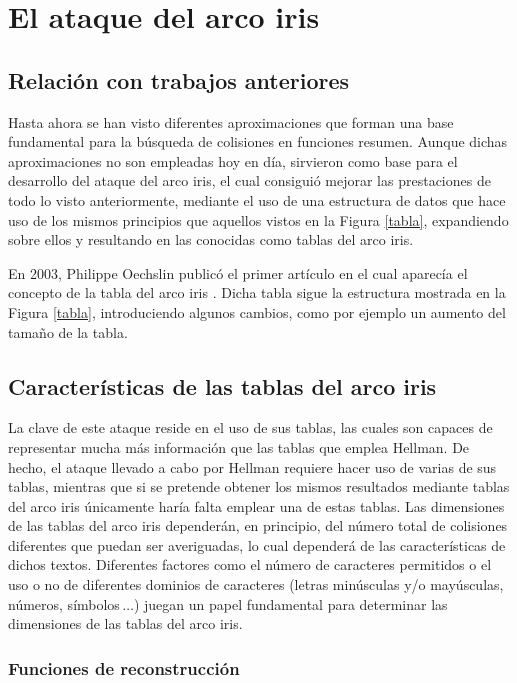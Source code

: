 \documentclass[12pt,spanish,listoffigures,listoftables,listofalgorithms]{tfgetsinf}
\begin{document}
\chapter{El ataque del arco iris} \label{ataque}

\section{Relación con trabajos anteriores}

Hasta ahora se han visto diferentes aproximaciones que forman una base fundamental para la búsqueda de colisiones en funciones resumen. Aunque dichas aproximaciones no son empleadas hoy en día, sirvieron como base para el desarrollo del ataque del arco iris, el cual consiguió mejorar las prestaciones de todo lo visto anteriormente, mediante el uso de una estructura de datos que hace uso de los mismos principios que aquellos vistos en la Figura \ref{tabla}, expandiendo sobre ellos y resultando en las conocidas como tablas del arco iris.

En 2003, Philippe Oechslin publicó el primer artículo en el cual aparecía el concepto de la tabla del arco iris \cite{rainbow}. Dicha tabla sigue la estructura mostrada en la Figura \ref{tabla}, introduciendo algunos cambios, como por ejemplo un aumento del tamaño de la tabla.

\section{Características de las tablas del arco iris}

La clave de este ataque reside en el uso de sus tablas, las cuales son capaces de representar mucha más información que las tablas que emplea Hellman. De hecho, el ataque llevado a cabo por Hellman requiere hacer uso de varias de sus tablas, mientras que si se pretende obtener los mismos resultados mediante tablas del arco iris únicamente haría falta emplear una de estas tablas. Las dimensiones de las tablas del arco iris dependerán, en principio, del número total de colisiones diferentes que puedan ser averiguadas, lo cual dependerá de las características de dichos textos. Diferentes factores como el número de caracteres permitidos o el uso o no de diferentes dominios de caracteres (letras minúsculas y/o mayúsculas, números, símbolos$\, \dots$) juegan un papel fundamental para determinar las dimensiones de las tablas del arco iris. 

\subsection{Funciones de reconstrucción}
\end{document}
